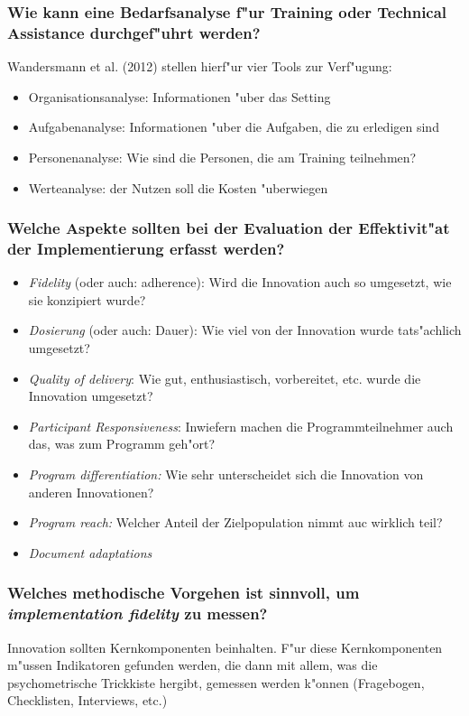 \subsubsection{Wie kann eine Bedarfsanalyse f"ur Training oder Technical Assistance durchgef"uhrt werden?}
Wandersmann et al. (2012) stellen hierf"ur vier Tools zur Verf"ugung:
\begin{itemize}
        \item Organisationsanalyse: Informationen "uber das Setting
        \item Aufgabenanalyse: Informationen "uber die Aufgaben, die zu erledigen sind
        \item Personenanalyse: Wie sind die Personen, die am Training teilnehmen?
        \item Werteanalyse: der Nutzen soll die Kosten "uberwiegen
\end{itemize}

\subsubsection{Welche Aspekte sollten bei der Evaluation der Effektivit"at der Implementierung erfasst werden?}
\begin{itemize}
        \item \emph{Fidelity} (oder auch: adherence): Wird die Innovation auch so umgesetzt, wie sie konzipiert wurde?
        \item \emph{Dosierung} (oder auch: Dauer): Wie viel von der Innovation wurde tats"achlich umgesetzt?
        \item \emph{Quality of delivery}: Wie gut, enthusiastisch, vorbereitet, etc. wurde die Innovation umgesetzt?
        \item \emph{Participant Responsiveness}: Inwiefern machen die Programmteilnehmer auch das, was zum Programm geh"ort?
        \item \emph{Program differentiation:} Wie sehr unterscheidet sich die Innovation von anderen Innovationen?
        \item \emph{Program reach:} Welcher Anteil der Zielpopulation nimmt auc wirklich teil?
        \item \emph{Document adaptations}
\end{itemize}

\subsubsection{Welches methodische Vorgehen ist sinnvoll, um \emph{implementation fidelity} zu messen?}
Innovation sollten Kernkomponenten beinhalten. F"ur diese Kernkomponenten m"ussen Indikatoren gefunden werden, die dann mit allem, was die psychometrische Trickkiste hergibt, gemessen werden k"onnen (Fragebogen, Checklisten, Interviews, etc.)
